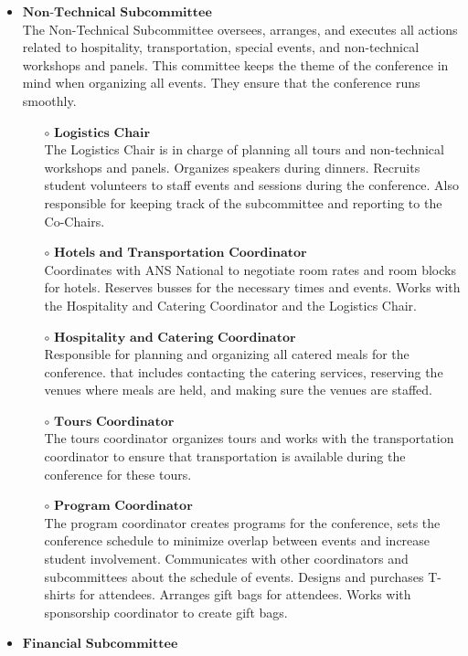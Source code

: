 \begin{itemize}
	\item $\textbf{Non-Technical Subcommittee}$\\
	The Non-Technical Subcommittee oversees, arranges, and executes all actions related to hospitality, transportation, special events, and non-technical workshops and panels. This committee keeps the theme of the conference in mind when organizing all events. They ensure that the conference runs smoothly.
	\begin{itemize}
		\item[$\circ$] $\textbf{Logistics Chair}$\\
		The Logistics Chair is in charge of planning all tours and non-technical workshops and panels. Organizes speakers during dinners. Recruits student volunteers to staff events and sessions during the conference.
		Also responsible for keeping track of the subcommittee and reporting to the Co-Chairs.
		\item[$\circ$] $\textbf{Hotels and Transportation Coordinator}$\\
		Coordinates with ANS National to negotiate room rates and room blocks for hotels. Reserves busses for the 
		necessary times and events. Works with the Hospitality and Catering Coordinator and the Logistics Chair.
		\item[$\circ$] $\textbf{Hospitality and Catering Coordinator}$\\
		Responsible for planning and organizing all catered meals for the conference. that includes contacting the catering services, reserving the venues where meals are held, and making sure the venues are staffed.
		\item[$\circ$]$\textbf{Tours Coordinator}$\\
		The tours coordinator organizes tours and works with the transportation coordinator to ensure that transportation is available during the conference for these tours.
		\item[$\circ$]$\textbf{Program Coordinator}$\\
		The program coordinator creates programs for the conference, sets the conference schedule to minimize overlap between events and increase student involvement. Communicates with other coordinators and subcommittees about the schedule of events. Designs and purchases T-shirts for attendees. Arranges gift bags for attendees. Works with sponsorship coordinator to create gift bags.
	\end{itemize}
	\item $\textbf{Financial Subcommittee}$\\

\end{itemize}
